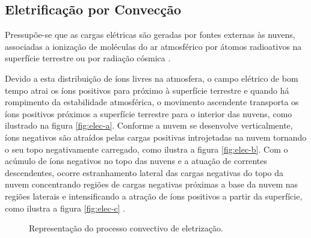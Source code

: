 \subsection{Eletrificação por Convecção}

Pressupõe-se que as cargas elétricas são geradas por fontes externas às nuvens, associadas a ionização de moléculas do ar atmosférico por átomos radioativos na superfície terrestre ou por radiação cósmica \cite{wilson1956,grenet1947, vonnegut1962,phillips1967}.

Devido a esta distribuição de íons livres na atmosfera, o campo elétrico de bom tempo atrai os íons positivos para próximo à superfície terrestre e quando há rompimento da estabilidade atmosférica, o movimento ascendente transporta os íons positivos próximos a superfície terrestre para o interior das nuvens, como ilustrado na figura \ref{fig:elec-a}. Conforme a nuvem se desenvolve verticalmente, íons negativos são atraídos pelas cargas positivas introjetadas na nuvem tornando o seu topo  negativamente carregado, como ilustra a figura \ref{fig:elec-b}. Com o acúmulo de íons negativos no topo das nuvens e a atuação de correntes descendentes, ocorre estranhamento lateral das cargas negativas do topo da nuvem concentrando regiões de cargas negativas próximas a base da nuvem nas regiões laterais e intensificando a atração de íons positivos a partir da superfície, como ilustra a figura \ref{fig:elec-c} \cite{vonnegut1962,wagner1981,vonnegut1995}.


\begin{figure}[ht]
   \centering
   \caption{Representação do processo convectivo de eletrização.}
   \label{fig:elec}
\end{figure}

